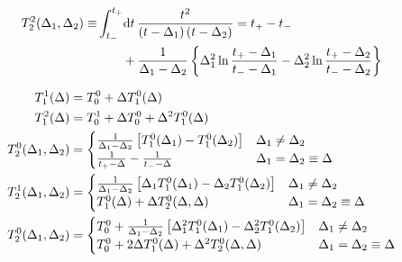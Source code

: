 \documentclass[english,notitlepage]{article}
\begin{document}
\begin{subequations}
\begin{align}
            \nonumber
            T_2^2(\Delta_1, \Delta_2) \equiv & \int_{t_-}^{t_+} \!\mathrm{d}t\, \frac{t^2}{\left(t-\Delta_1\right)\left(t-\Delta_2\right)} = t_+ - t_-                                                                                                                           \\
                                             & \qquad + \frac{1}{\Delta_1 - \Delta_2} \left\{\Delta_1^2 \ln\frac{t_+-\Delta_1}{t_--\Delta_1} - \Delta_2^2 \ln\frac{t_+-\Delta_2}{t_--\Delta_2}\right\}
        \end{align}
    \end{subequations}

    \begin{subequations}
        \begin{align}
            T_1^1(\Delta) & = T_0^0 + \Delta T_1^0(\Delta) \\
            T_1^2(\Delta) & = T_0^1 + \Delta T_0^0 + \Delta^2 T_1^0(\Delta) \\
            T_2^0(\Delta_1, \Delta_2) & = \begin{cases}
                \frac{1}{\Delta_1 - \Delta_2} \left[T_1^0(\Delta_1) - T_1^0(\Delta_2)\right] & \Delta_1 \neq \Delta_2 \\
                \frac{1}{t_+ - \Delta} - \frac{1}{t_- - \Delta} & \Delta_1 = \Delta_2 \equiv \Delta
            \end{cases} \\
            T_2^1(\Delta_1, \Delta_2) & = \begin{cases}
                \frac{1}{\Delta_1 - \Delta_2} \left[\Delta_1 T_1^0(\Delta_1) - \Delta_2 T_1^0(\Delta_2)\right] & \Delta_1 \neq \Delta_2 \\
                T_1^0(\Delta) + \Delta T_2^0(\Delta, \Delta) & \Delta_1 = \Delta_2 \equiv \Delta
            \end{cases} \\
            T_2^0(\Delta_1, \Delta_2) & = \begin{cases}
                T_0^0 + \frac{1}{\Delta_1 - \Delta_2} \left[\Delta_1^2 T_1^0(\Delta_1) - \Delta_2^2 T_1^0(\Delta_2)\right] & \Delta_1 \neq \Delta_2 \\
                T_0^0 + 2\Delta T_1^0(\Delta) + \Delta^2 T_2^0(\Delta, \Delta) & \Delta_1 = \Delta_2 \equiv \Delta
            \end{cases}
        \end{align}
    \end{subequations}
\end{document}
